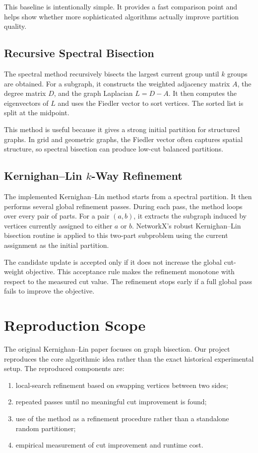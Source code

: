 \documentclass[11pt]{article}
\begin{document}
This baseline is intentionally simple. It provides a fast comparison point and
helps show whether more sophisticated algorithms actually improve partition
quality.

\subsection{Recursive Spectral Bisection}

The spectral method recursively bisects the largest current group until $k$
groups are obtained. For a subgraph, it constructs the weighted adjacency
matrix $A$, the degree matrix $D$, and the graph Laplacian $L=D-A$. It then
computes the eigenvectors of $L$ and uses the Fiedler vector to sort vertices.
The sorted list is split at the midpoint.

This method is useful because it gives a strong initial partition for
structured graphs. In grid and geometric graphs, the Fiedler vector often
captures spatial structure, so spectral bisection can produce low-cut balanced
partitions.

\subsection{Kernighan--Lin $k$-Way Refinement}

The implemented Kernighan--Lin method starts from a spectral partition. It then
performs several global refinement passes. During each pass, the method loops
over every pair of parts. For a pair $(a,b)$, it extracts the subgraph induced
by vertices currently assigned to either $a$ or $b$. NetworkX's robust
Kernighan--Lin bisection routine is applied to this two-part subproblem using
the current assignment as the initial partition.

The candidate update is accepted only if it does not increase the global
cut-weight objective. This acceptance rule makes the refinement monotone with
respect to the measured cut value. The refinement stops early if a full global
pass fails to improve the objective.

\section{Reproduction Scope}

The original Kernighan--Lin paper focuses on graph bisection. Our project
reproduces the core algorithmic idea rather than the exact historical
experimental setup. The reproduced components are:
\begin{enumerate}
    \item local-search refinement based on swapping vertices between two
    sides;
    \item repeated passes until no meaningful cut improvement is found;
    \item use of the method as a refinement procedure rather than a standalone
    random partitioner;
    \item empirical measurement of cut improvement and runtime cost.
\end{enumerate}
\end{document}
